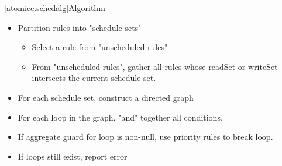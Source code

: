 [atomicc.schedalg]{Algorithm}

\begin{itemize}
\item Partition rules into "schedule sets"
\begin{itemize}
\item Select a rule from "unscheduled rules"
\item From "unscheduled rules", gather all rules whose readSet or writeSet intersects the current schedule set.
\end{itemize}
\item For each schedule set, construct a directed graph
\item For each loop in the graph, "and" together all conditions.
\item If aggregate guard for loop is non-null, use priority rules to break loop.
\item If loops still exist, report error
\end{itemize}

